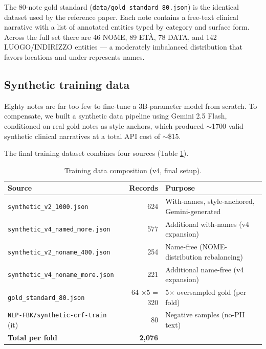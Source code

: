 \documentclass[11pt,a4paper]{article}
\begin{document}
The 80-note gold standard (\texttt{data/gold\_standard\_80.json}) is the identical dataset used by the reference paper. Each note contains a free-text clinical narrative with a list of annotated entities typed by category and surface form. Across the full set there are 46 NOME, 89 ETÀ, 78 DATA, and 142 LUOGO/INDIRIZZO entities — a moderately imbalanced distribution that favors locations and under-represents names.

\subsection{Synthetic training data}

Eighty notes are far too few to fine-tune a 3B-parameter model from scratch. To compensate, we built a synthetic data pipeline using Gemini 2.5 Flash, conditioned on real gold notes as style anchors, which produced $\sim$1700 valid synthetic clinical narratives at a total API cost of $\sim$\$15.

The final training dataset combines four sources (Table \ref{tab:data-sources}).

\begin{table}[h]
\centering
\caption{Training data composition (v4, final setup).}
\label{tab:data-sources}
\begin{tabular}{lrl}
\toprule
Source & Records & Purpose \\
\midrule
\texttt{synthetic\_v2\_1000.json}      & 624  & With-names, style-anchored, Gemini-generated \\
\texttt{synthetic\_v4\_named\_more.json}  & 577  & Additional with-names (v4 expansion) \\
\texttt{synthetic\_v2\_noname\_400.json}  & 254  & Name-free (NOME-distribution rebalancing) \\
\texttt{synthetic\_v4\_noname\_more.json} & 221  & Additional name-free (v4 expansion) \\
\texttt{gold\_standard\_80.json}       & 64 $\times 5$ = 320 & 5$\times$ oversampled gold (per fold) \\
\texttt{NLP-FBK/synthetic-crf-train} (it) & 80 & Negative samples (no-PII text) \\
\midrule
\textbf{Total per fold}                & \textbf{2{,}076} & \\
\bottomrule
\end{tabular}
\end{table}
\end{document}

